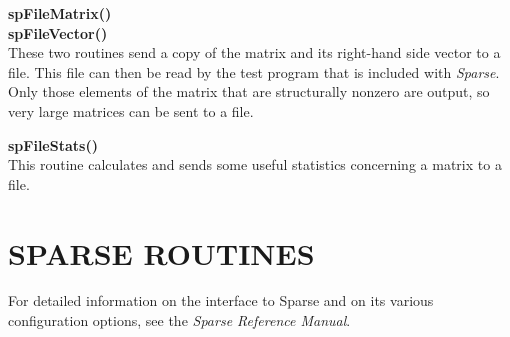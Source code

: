 \documentclass[11pt]{article}
\begin{document}
{\bf spFileMatrix()}\\
{\bf spFileVector()}\\
These two routines send a copy of the matrix and its right-hand side
vector to a file.  This file can then be read by the test program that
is included with \emph{Sparse}.  Only those elements of the matrix that
are structurally nonzero are output, so very large matrices can be sent
to a file.

{\bf spFileStats()}\\
This routine calculates and sends some useful statistics concerning a
matrix to a file.

\section{SPARSE ROUTINES}
For detailed information on the interface to Sparse and on its various
configuration options, see the \emph{Sparse Reference Manual}.
\end{document}
